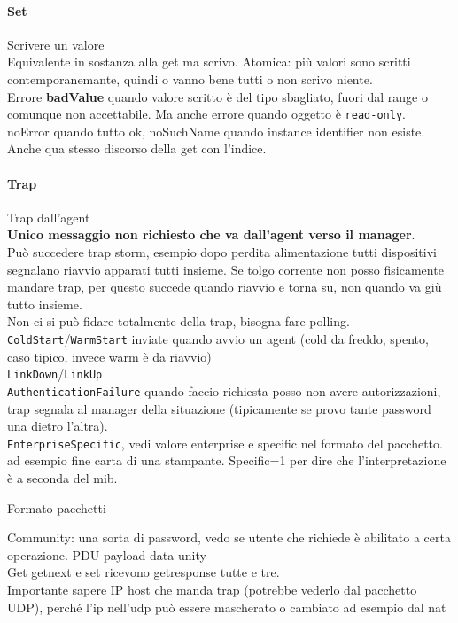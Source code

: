 \documentclass[10pt]{book}
\begin{document}
\paragraph{Set} Scrivere un valore\\
Equivalente in sostanza alla get ma scrivo. Atomica: più valori sono scritti contemporanemante, quindi o vanno bene tutti o non scrivo niente.\\
Errore \textbf{badValue} quando valore scritto è del tipo sbagliato, fuori dal range o comunque non accettabile. Ma anche errore quando oggetto è \texttt{read-only}.\\
noError quando tutto ok, noSuchName quando instance identifier non esiste. Anche qua stesso discorso della get con l'indice.
\paragraph{Trap} Trap dall'agent\\
\textbf{Unico messaggio non richiesto che va dall'agent verso il manager}.\\
Può succedere trap storm, esempio dopo perdita alimentazione tutti dispositivi segnalano riavvio apparati tutti insieme. Se tolgo corrente non posso fisicamente mandare trap, per questo succede quando riavvio e torna su, non quando va giù tutto insieme.\\
Non ci si può fidare totalmente della trap, bisogna fare polling.\\
\texttt{ColdStart}/\texttt{WarmStart} inviate quando avvio un agent (cold da freddo, spento, caso tipico, invece warm è da riavvio)\\
\texttt{LinkDown}/\texttt{LinkUp}\\
\texttt{AuthenticationFailure} quando faccio richiesta posso non avere autorizzazioni, trap segnala al manager della situazione (tipicamente se provo tante password una dietro l'altra).\\
\texttt{EnterpriseSpecific}, vedi valore enterprise e specific nel formato del pacchetto. ad esempio fine carta di una stampante. Specific=1 per dire che l'interpretazione è a seconda del mib.
\begin{center}
	Formato pacchetti
\end{center}
Community: una sorta di password, vedo se utente che richiede è abilitato a certa operazione. PDU payload data unity\\
Get getnext e set ricevono getresponse tutte e tre.\\
Importante sapere IP host che manda trap (potrebbe vederlo dal pacchetto UDP), perché l'ip nell'udp può essere mascherato o cambiato ad esempio dal nat\\\\
\end{document}
